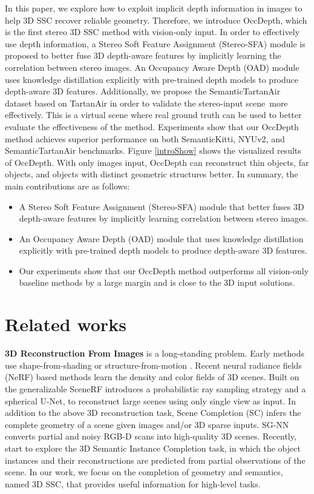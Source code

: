 \documentclass{article}
\begin{document}
	In this paper, we explore how to exploit implicit depth information in images to help 3D SSC recover reliable geometry. Therefore, we introduce OccDepth, which is the first stereo 3D SSC method with vision-only input. In order to effectively use depth information, a Stereo Soft Feature Assignment (Stereo-SFA) module is proposed to better fuse 3D depth-aware features by implicitly learning the correlation between stereo images. An Occupancy Aware Depth (OAD) module uses knowledge distillation explicitly with pre-trained depth models to produce depth-aware 3D features. Additionally, we propose the SemanticTartanAir dataset based on TartanAir in order to validate the stereo-input scene more effectively. This is a virtual scene where real ground truth can be used to better evaluate the effectiveness of the method. Experiments show that our OccDepth method achieves superior performance on both SemanticKitti, NYUv2, and SemanticTartanAir benchmarks. Figure \ref{introShow} shows the visualized results of OccDepth. With only images input, OccDepth can reconstruct thin objects, far objects, and objects with distinct geometric structures better.
	In summary, the main contributions are as follows:
	\begin{itemize}
		\item A Stereo Soft Feature Assignment (Stereo-SFA) module that better fuses 3D depth-aware features by implicitly learning correlation between stereo images.
		\item An Occupancy Aware Depth (OAD) module that uses knowledge distillation explicitly with pre-trained depth models to produce depth-aware 3D features.
		\item Our experiments show that our OccDepth method outperforms all vision-only baseline methods by a large margin and is close to the 3D input solutions.
	\end{itemize}
	\section{Related works}
	\textbf{3D Reconstruction From Images} is a long-standing problem. Early methods use shape-from-shading \cite{durou2008numerical} or structure-from-motion \cite{schonberger2016structure,cui2017hsfm}. Recent neural radiance fields (NeRF) based methods \cite{mildenhall2021nerf} learn the density and color fields of 3D scenes. Built on the generalizable SceneRF \cite{cao2022scenerf} introduces a probabilistic ray sampling strategy and a spherical U-Net, to reconstruct large scenes using only single view as input. In addition to the above 3D reconstruction task, Scene Completion (SC) infers the complete geometry of a scene given images and/or 3D sparse inputs. SG-NN \cite{dai2020sg} converts partial and noisy RGB-D scans into high-quality 3D scenes. Recently, \cite{engelmann2021points,li2021joint,liu2021voxel,sharma2022seeing} start to explore the 3D Semantic Instance Completion task, in which the object instances and their reconstructions are predicted from partial observations of the scene. In our work, we focus on the completion of geometry and semantics, named 3D SSC, that provides useful information for high-level tasks. 
	
\end{document}
